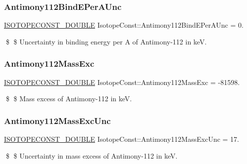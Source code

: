 \subsubsection{\texorpdfstring{Antimony112\+Bind\+E\+Per\+A\+Unc}{Antimony112BindEPerAUnc}}
{\footnotesize\ttfamily \mbox{\hyperlink{group___isotope_const-_macros_ga8f45a7272ce02c0b4c65c44636ed719a}{I\+S\+O\+T\+O\+P\+E\+C\+O\+N\+S\+T\+\_\+\+D\+O\+U\+B\+LE}} Isotope\+Const\+::\+Antimony112\+Bind\+E\+Per\+A\+Unc = 0.}

\$ \$ Uncertainty in binding energy per A of Antimony-\/112 in keV. \mbox{\label{group___isotope_const-_antimony-_sb112_ga76be430b98f7592f60d03f25cf4275d7}} 
\subsubsection{\texorpdfstring{Antimony112\+Mass\+Exc}{Antimony112MassExc}}
{\footnotesize\ttfamily \mbox{\hyperlink{group___isotope_const-_macros_ga8f45a7272ce02c0b4c65c44636ed719a}{I\+S\+O\+T\+O\+P\+E\+C\+O\+N\+S\+T\+\_\+\+D\+O\+U\+B\+LE}} Isotope\+Const\+::\+Antimony112\+Mass\+Exc = -\/81598.}

\$ \$ Mass excess of Antimony-\/112 in keV. \mbox{\label{group___isotope_const-_antimony-_sb112_ga570967ef9d3c386ab05ded342ca3af3f}} 
\subsubsection{\texorpdfstring{Antimony112\+Mass\+Exc\+Unc}{Antimony112MassExcUnc}}
{\footnotesize\ttfamily \mbox{\hyperlink{group___isotope_const-_macros_ga8f45a7272ce02c0b4c65c44636ed719a}{I\+S\+O\+T\+O\+P\+E\+C\+O\+N\+S\+T\+\_\+\+D\+O\+U\+B\+LE}} Isotope\+Const\+::\+Antimony112\+Mass\+Exc\+Unc = 17.}

\$ \$ Uncertainty in mass excess of Antimony-\/112 in keV. \mbox{\label{group___isotope_const-_antimony-_sb112_gaa47a37901b4a002004dde86e3854285a}} 
